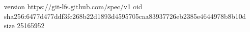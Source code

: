 version https://git-lfs.github.com/spec/v1
oid sha256:6477d477ddf3fc268b22d1893d4595705caa83937726eb2385e4644978b8b10d
size 25165952
